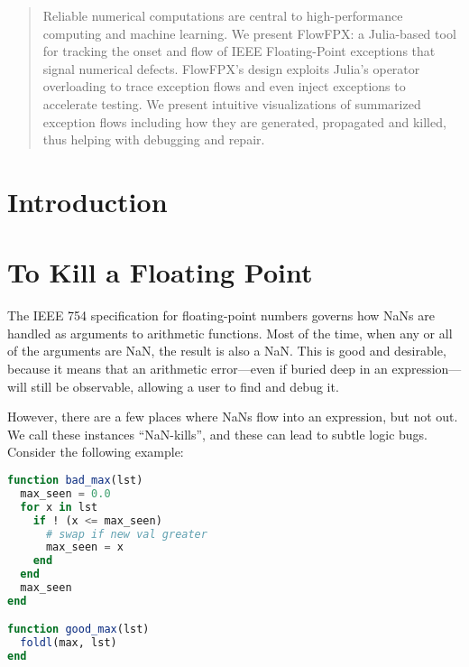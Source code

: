 \documentclass{juliacon}
\begin{document}

\maketitle

\begin{abstract}
  Reliable numerical computations are central to high-performance computing and machine learning.
  We present FlowFPX: a Julia-based tool for tracking the onset and flow of IEEE Floating-Point exceptions that signal numerical defects.
  FlowFPX's design exploits Julia's operator overloading to trace exception flows and even inject exceptions to accelerate testing.
  We present intuitive visualizations of summarized exception flows including how they are generated, propagated and killed, thus helping with debugging and repair.
\end{abstract}

\section{Introduction}

\section{To Kill a Floating Point}

The IEEE 754 specification for floating-point numbers \cite{IEEEStandardBinary1985} governs how NaNs are handled as arguments to arithmetic functions.
Most of the time, when any or all of the arguments are NaN, the result is also a NaN.
This is good and desirable, because it means that an arithmetic error---even if buried deep in an expression---will still be observable, allowing a user to find and debug it.

However, there are a few places where NaNs flow into an expression, but not out.
We call these instances ``NaN-kills'', and these can lead to subtle logic bugs.
Consider the following example:

\begin{lstlisting}[language = Julia]
function bad_max(lst)
  max_seen = 0.0
  for x in lst
    if ! (x <= max_seen)
      # swap if new val greater
      max_seen = x
    end
  end
  max_seen
end

function good_max(lst)
  foldl(max, lst)
end
\end{lstlisting}
\end{document}
